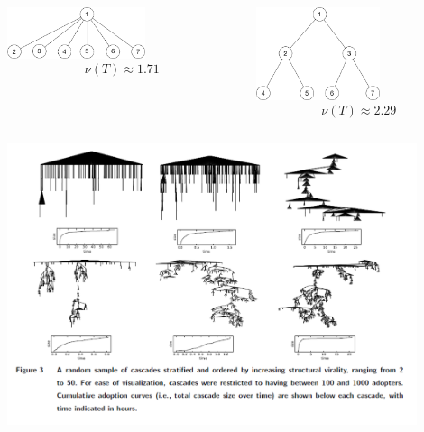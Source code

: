 \documentclass[aspectratio=169]{beamer}
\begin{document}
\begin{frame}

\begin{columns}

\begin{center}
\includegraphics[width=0.6\textwidth]{figures/broadcast_tree}
$$\nu(T) \approx 1.71$$ 
\end{center}

\begin{center}
\includegraphics[width=0.6\textwidth]{figures/viral_tree}
$$\nu(T) \approx 2.29$$ 
\end{center}
\end{columns}

\end{frame}
\begin{frame}

\begin{center}
\includegraphics[width=0.9\textwidth]{figures/goel_structural_2016_fig3}
\end{center}

\end{frame}
\end{document}
